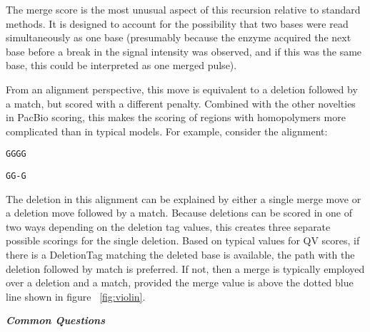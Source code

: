 \documentclass[paper=a4, fontsize=11pt]{scrartcl}
\numberwithin{equation}{section}		%
\numberwithin{figure}{section}			%
\numberwithin{table}{section}				%
\begin{document}
The merge score is the most unusual aspect of this recursion relative to standard methods.  It is designed to account for the possibility that two bases were read simultaneously as one base (presumably because the enzyme acquired the next base before a break in the signal intensity was observed, and if this was the same base, this could be interpreted as one merged pulse).

From an alignment perspective, this move is equivalent to a deletion followed by a match, but scored with a different penalty.  Combined with the other novelties in PacBio scoring, this makes the scoring of regions with homopolymers more complicated than in typical models.  For example, consider the alignment:

\begin{center}
\texttt{GGGG}

\texttt{GG-G}
\end{center}

The deletion in this alignment can be explained by either a single merge move or a deletion move followed by a match.  Because deletions can be scored in one of two ways depending on the deletion tag values, this creates three separate possible scorings for the single deletion.  Based on typical values for QV scores, if there is a DeletionTag matching the deleted base is available, the path with the deletion followed by match is preferred.  If not, then a merge is typically employed over a deletion and a match, provided the merge value is above the dotted blue line shown in figure ~\ref{fig:violin}.

\newpage

\setlength\cftbeforefaqtitleskip{4em} %
\setlength\cftafterfaqtitleskip{1em} %
\setlength\cftparskip{.3em} %


\begin{center}
\Huge{\bf \emph{Common Questions}} %
\end{center}
\listofquestions %
\end{document}
